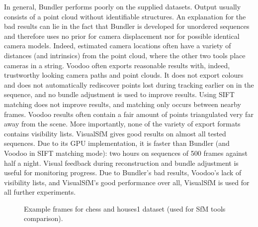 In general, Bundler performs poorly on the supplied datasets. Output usually consists of a point cloud without identifiable structures. An explanation for the bad results can lie in the fact that Bundler is developed for unordered sequences and therefore uses no prior for camera displacement nor for possible identical camera models. Indeed, estimated camera locations often have a variety of distances (and intrinsics) from the point cloud, where the other two tools place cameras in a string. Voodoo often exports reasonable results with, indeed, trustworthy looking camera paths and point clouds. It does not export colours and does not automatically rediscover points lost during tracking earlier on in the sequence, and no bundle adjustment is used to improve results. Using SIFT matching does not improve results, and matching only occurs between nearby frames. Voodoo results often contain a fair amount of points triangulated very far away from the scene. More importantly, none of the variety of export formats contains visibility lists. VisualSfM gives good results on almost all tested sequences. Due to its GPU implementation, it is faster than Bundler (and Voodoo in SIFT matching mode): two hours on sequences of 500 frames against half a night. Visual feedback during reconstruction and bundle adjustment is useful for monitoring progress. Due to Bundler's bad results, Voodoo's lack of visibility lists, and VisualSfM's good performance over all, VisualSfM is used for all further experiments.

\begin{figure}[htb!]
 \centering
 \caption{Example frames for chess and houses1 dataset (used for SfM tools comparison).}
 \label{fig:sfmcomparison0}
\end{figure}

